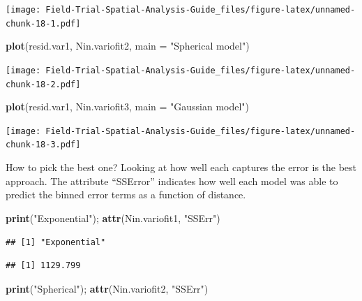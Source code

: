 \documentclass[]{book}
\newenvironment{Shaded}{\begin{snugshade}}{\end{snugshade}}
\newcommand{\DataTypeTok}[1]{\textcolor[rgb]{0.13,0.29,0.53}{#1}}
\newcommand{\KeywordTok}[1]{\textcolor[rgb]{0.13,0.29,0.53}{\textbf{#1}}}
\newcommand{\NormalTok}[1]{#1}
\newcommand{\StringTok}[1]{\textcolor[rgb]{0.31,0.60,0.02}{#1}}
\begin{document}
\texttt{[image: Field-Trial-Spatial-Analysis-Guide\_files/figure-latex/unnamed-chunk-18-1.pdf]}

\begin{Shaded}
\begin{Highlighting}[]
\KeywordTok{plot}\NormalTok{(resid.var1, Nin.variofit2, }\DataTypeTok{main =} \StringTok{"Spherical model"}\NormalTok{)}
\end{Highlighting}
\end{Shaded}

\texttt{[image: Field-Trial-Spatial-Analysis-Guide\_files/figure-latex/unnamed-chunk-18-2.pdf]}

\begin{Shaded}
\begin{Highlighting}[]
\KeywordTok{plot}\NormalTok{(resid.var1, Nin.variofit3, }\DataTypeTok{main =} \StringTok{"Gaussian model"}\NormalTok{)}
\end{Highlighting}
\end{Shaded}

\texttt{[image: Field-Trial-Spatial-Analysis-Guide\_files/figure-latex/unnamed-chunk-18-3.pdf]}

How to pick the best one? Looking at how well each captures the error is the best approach. The attribute ``SSError'' indicates how well each model was able to predict the binned error terms as a function of distance.

\begin{Shaded}
\begin{Highlighting}[]
\KeywordTok{print}\NormalTok{(}\StringTok{"Exponential"}\NormalTok{); }\KeywordTok{attr}\NormalTok{(Nin.variofit1, }\StringTok{"SSErr"}\NormalTok{)}
\end{Highlighting}
\end{Shaded}

\begin{verbatim}
## [1] "Exponential"
\end{verbatim}

\begin{verbatim}
## [1] 1129.799
\end{verbatim}

\begin{Shaded}
\begin{Highlighting}[]
\KeywordTok{print}\NormalTok{(}\StringTok{"Spherical"}\NormalTok{); }\KeywordTok{attr}\NormalTok{(Nin.variofit2, }\StringTok{"SSErr"}\NormalTok{)}
\end{Highlighting}
\end{Shaded}
\end{document}
